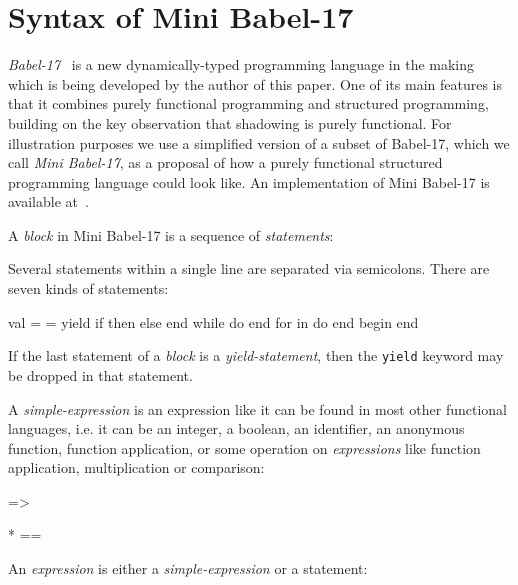 \documentclass{llncs}
\newcommand{\bsrc}[1] {\lstinline!#1!}
\begin{document}
\section{Syntax of Mini Babel-17}
\emph{Babel-17}~\cite{babel17} is a new dynamically-typed programming language in the making which is being developed by the author of this paper. One of its main features is that it combines purely functional programming and structured programming, building on the key observation that shadowing is purely functional. For illustration purposes we use a simplified version of a subset of Babel-17, which we call \emph{Mini Babel-17}, as a proposal of how a purely functional structured programming language could look like. An implementation of  Mini Babel-17 is available at~\cite{minibabel17}.

A \emph{block} in Mini Babel-17 is a sequence of \emph{statements}:
\begin{babellisting}
  
              
          

\end{babellisting}
Several statements within a single line are separated via semicolons. There are seven kinds of statements: 
\begin{babellisting}
  
              
              
              
              
              
                          

  val  = 
   = 
  yield  
  if  then  else  end 
  while  do  end 
  for  in  do  end 
  begin  end 
\end{babellisting}
If the last statement of a \emph{block} is  a \emph{yield-statement}, then the \bsrc{yield} keyword may be dropped in that statement. 

A \emph{simple-expression} is an expression like it can be found in most other functional languages, i.e. it can be an integer, a boolean, an identifier, an anonymous function, function application, or some operation on  \emph{expressions} like function application, multiplication or comparison:
\begin{babellisting}
  
          
      => 
          
      * 
      ==     
    
\end{babellisting}
An \emph{expression} is either a \emph{simple-expression} or a statement:
\begin{babellisting}
   
               
               
               
                           
\end{babellisting}
\end{document}
